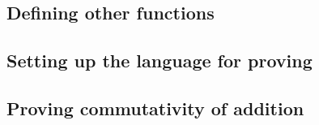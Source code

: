 \subsection{Defining other functions}


\subsection{Setting up the language for proving}


\subsection{Proving commutativity of addition}


